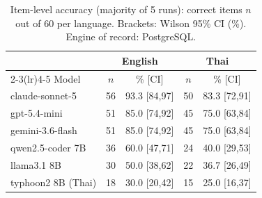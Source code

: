 \begin{table}[t]
\caption{Item-level accuracy (majority of 5 runs): correct items $n$
out of 60 per language. Brackets: Wilson 95\% CI (\%). Engine of
record: PostgreSQL.}
\label{tab:headline}
\centering\footnotesize\setlength{\tabcolsep}{3.5pt}
\begin{tabular}{lcccc}
\toprule
 & \multicolumn{2}{c}{English} & \multicolumn{2}{c}{Thai} \\
\cmidrule(lr){2-3}\cmidrule(lr){4-5}
Model & $n$ & \% [CI] & $n$ & \% [CI] \\
\midrule
claude-sonnet-5 & 56 & 93.3 [84,97] & 50 & 83.3 [72,91] \\
gpt-5.4-mini & 51 & 85.0 [74,92] & 45 & 75.0 [63,84] \\
gemini-3.6-flash & 51 & 85.0 [74,92] & 45 & 75.0 [63,84] \\
qwen2.5-coder 7B & 36 & 60.0 [47,71] & 24 & 40.0 [29,53] \\
llama3.1 8B & 30 & 50.0 [38,62] & 22 & 36.7 [26,49] \\
typhoon2 8B (Thai) & 18 & 30.0 [20,42] & 15 & 25.0 [16,37] \\
\bottomrule
\end{tabular}
\end{table}
